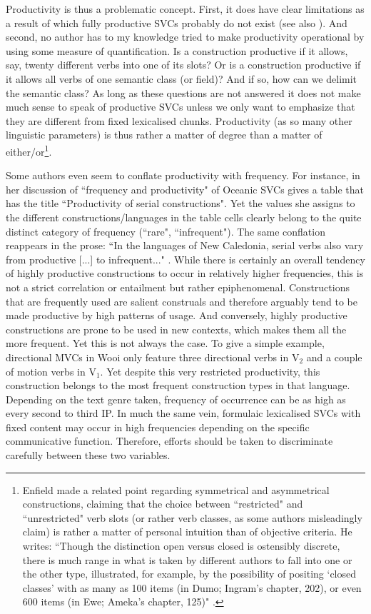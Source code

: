 Productivity is thus a problematic concept. First, it does have clear limitations as a result of which fully productive SVCs probably do not exist (see also \citealt[40]{sebba1987syntax}). And second, no author has to my knowledge tried to make productivity operational by using some measure of quantification. Is a construction productive if it allows, say, twenty different verbs into one of its slots? Or is a construction productive if it allows all verbs of one semantic class (or field)? And if so, how can we delimit the semantic class? As long as these questions are not answered it does not make much sense to speak of productive SVCs unless we only want to emphasize that they are different from fixed lexicalised chunks. Productivity (as so many other linguistic parameters) is thus rather a matter of degree than a matter of either/or\footnote{Enfield made a related point regarding symmetrical and asymmetrical constructions, claiming that the choice between ``restricted" and ``unrestricted" verb slots (or rather verb classes, as some authors misleadingly claim) is rather a matter of personal intuition than of objective criteria. He writes: ``Though the distinction open versus closed is ostensibly discrete, there is much range in what is taken by different authors to fall into one or the other type, illustrated, for example, by the possibility of positing `closed classes’ with as many as 100 items (in Dumo; Ingram’s chapter, 202), or even 600 items (in Ewe; Ameka’s chapter, 125)" \citep[449]{enfield2009review}.}.

Some authors even seem to conflate productivity with frequency. For instance, \citet[9]{bril2004complex} in her discussion of ``frequency and productivity" of Oceanic SVCs gives a table that has the title ``Productivity of serial constructions". Yet the values she assigns to the different constructions/languages in the table cells clearly belong to the quite distinct category of frequency (``rare", ``infrequent"). The same conflation reappears in the prose: ``In the languages of New Caledonia, serial verbs also vary from productive [...] to infrequent..." \citep[10]{bril2004complex}. While there is certainly an overall tendency of highly productive constructions to occur in relatively higher frequencies, this is not a strict correlation or entailment but rather epiphenomenal. Constructions that are frequently used are salient construals and therefore arguably tend to be made productive by high patterns of usage. And conversely, highly productive constructions are prone to be used in new contexts, which makes them all the more frequent. Yet this is not always the case. To give a simple example, directional MVCs in Wooi only feature three directional verbs in V$_2$ and a couple of motion verbs in V$_1$. Yet despite this very restricted productivity, this construction belongs to the most frequent construction types in that language. Depending on the text genre taken, frequency of occurrence can be as high as every second to third IP. In much the same vein, formulaic lexicalised SVCs with fixed content may occur in high frequencies depending on the specific communicative function. Therefore, efforts should be taken to discriminate carefully between these two variables.

